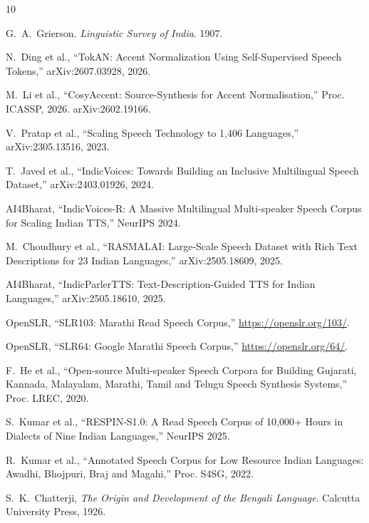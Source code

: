 \documentclass[11pt]{article}
\begin{document}
\begin{thebibliography}{10}

G.~A.~Grierson.
\textit{Linguistic Survey of India}. 1907.

N.~Ding et al., ``TokAN: Accent Normalization Using Self-Supervised Speech Tokens,'' arXiv:2607.03928, 2026.

M.~Li et al., ``CosyAccent: Source-Synthesis for Accent Normalisation,'' Proc. ICASSP, 2026. arXiv:2602.19166.

V.~Pratap et al., ``Scaling Speech Technology to 1,406 Languages,'' arXiv:2305.13516, 2023.

T.~Javed et al., ``IndicVoices: Towards Building an Inclusive Multilingual Speech Dataset,'' arXiv:2403.01926, 2024.

AI4Bharat, ``IndicVoices-R: A Massive Multilingual Multi-speaker Speech Corpus for Scaling Indian TTS,'' NeurIPS 2024.

M.~Choudhury et al., ``RASMALAI: Large-Scale Speech Dataset with Rich Text Descriptions for 23 Indian Languages,'' arXiv:2505.18609, 2025.

AI4Bharat, ``IndicParlerTTS: Text-Description-Guided TTS for Indian Languages,'' arXiv:2505.18610, 2025.

OpenSLR, ``SLR103: Marathi Read Speech Corpus,'' \url{https://openslr.org/103/}.

OpenSLR, ``SLR64: Google Marathi Speech Corpus,'' \url{https://openslr.org/64/}.

F.~He et al., ``Open-source Multi-speaker Speech Corpora for Building Gujarati, Kannada, Malayalam, Marathi, Tamil and Telugu Speech Synthesis Systems,'' Proc. LREC, 2020.

S.~Kumar et al., ``RESPIN-S1.0: A Read Speech Corpus of 10,000+ Hours in Dialects of Nine Indian Languages,'' NeurIPS 2025.

R.~Kumar et al., ``Annotated Speech Corpus for Low Resource Indian Languages: Awadhi, Bhojpuri, Braj and Magahi,'' Proc. S4SG, 2022.

S.~K.~Chatterji, \textit{The Origin and Development of the Bengali Language}. Calcutta University Press, 1926.


\end{thebibliography}
\end{document}
